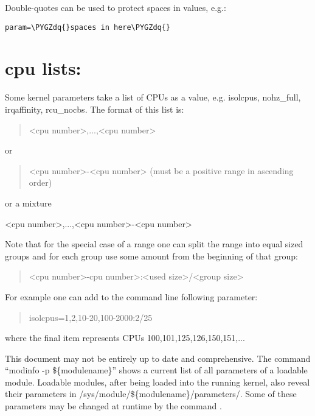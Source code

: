 \documentclass[a4paper,8pt,english]{sphinxmanual}
\def\PYGZdq{\char`\"}
\begin{document}
Double-quotes can be used to protect spaces in values, e.g.:

\begin{Verbatim}[commandchars=\\\{\}]
param=\PYGZdq{}spaces in here\PYGZdq{}
\end{Verbatim}


\section{cpu lists:}
\label{admin-guide/kernel-parameters:cpu-lists}
Some kernel parameters take a list of CPUs as a value, e.g.  isolcpus,
nohz\_full, irqaffinity, rcu\_nocbs.  The format of this list is:
\begin{quote}

\textless{}cpu number\textgreater{},...,\textless{}cpu number\textgreater{}
\end{quote}

or
\begin{quote}

\textless{}cpu number\textgreater{}-\textless{}cpu number\textgreater{}
(must be a positive range in ascending order)
\end{quote}

or a mixture

\textless{}cpu number\textgreater{},...,\textless{}cpu number\textgreater{}-\textless{}cpu number\textgreater{}

Note that for the special case of a range one can split the range into equal
sized groups and for each group use some amount from the beginning of that
group:
\begin{quote}

\textless{}cpu number\textgreater{}-cpu number\textgreater{}:\textless{}used size\textgreater{}/\textless{}group size\textgreater{}
\end{quote}

For example one can add to the command line following parameter:
\begin{quote}

isolcpus=1,2,10-20,100-2000:2/25
\end{quote}

where the final item represents CPUs 100,101,125,126,150,151,...

This document may not be entirely up to date and comprehensive. The command
``modinfo -p \$\{modulename\}'' shows a current list of all parameters of a loadable
module. Loadable modules, after being loaded into the running kernel, also
reveal their parameters in /sys/module/\$\{modulename\}/parameters/. Some of these
parameters may be changed at runtime by the command
.
\end{document}
